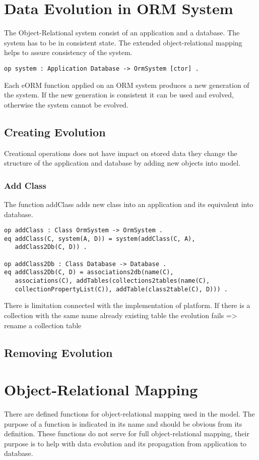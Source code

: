 \documentclass[11pt]{article}
\begin{document}
\section{Data Evolution in ORM System}
The Object-Relational system consist of an application and a database. The system has to be in consistent state. The extended object-relational mapping helps to assure consistency of the system.
\begin{verbatim}
op system : Application Database -> OrmSystem [ctor] .
\end{verbatim}
Each eORM function applied on an ORM system produces a new generation of the system. If the new generation is consistent it can be used and evolved, otherwise the system cannot be evolved.

\subsection{Creating Evolution}
Creational operations does not have impact on stored data they change the structure of the application and database by adding new objects into model.

\subsubsection{Add Class}
The function addClass adds new class into an application and its equivalent into database. 
\begin{verbatim}
op addClass : Class OrmSystem -> OrmSystem .
eq addClass(C, system(A, D)) = system(addClass(C, A), 
   addClass2Db(C, D)) .

op addClass2Db : Class Database -> Database .
eq addClass2Db(C, D) = associations2db(name(C), 
   associations(C), addTables(collections2tables(name(C), 
   collectionPropertyList(C)), addTable(class2table(C), D))) .
\end{verbatim}

There is limitation connected with the implementation of platform. If there is a collection with the same name already existing table the evolution fails => rename a collection table

\subsection{Removing Evolution}



\newpage
\appendix
\section{Object-Relational Mapping}
There are defined functions for object-relational mapping used in the model. The purpose of a function is indicated in its name and should be obvious from its definition. These functions do not serve for full object-relational mapping, their purpose is to help with data evolution and its propagation from application to database.
\end{document}
